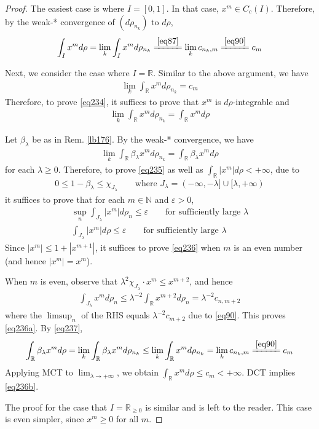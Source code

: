 \documentclass[12pt,b5paper,notitlepage]{article}
\theoremstyle{definition}
\theoremstyle{plain}
\newcommand{\Nbb}{\mathbb N}
\newcommand{\Rbb}{\mathbb R}
\newcommand{\eps}{\varepsilon}
\numberwithin{equation}{section}
\begin{document}
\begin{proof}
The easiest case is where $I=[0,1]$. In that case, $x^m\in C_c(I)$. Therefore, by the weak-* convergence of $(d\rho_{n_k})$ to $d\rho$,
\begin{align*}
\int_I x^md\rho=\lim_k\int_I x^md\rho_{n_k}\xlongequal{\eqref{eq87}}\lim_k c_{n_k,m}\xlongequal{\eqref{eq90}}c_m
\end{align*}

Next, we consider the case where $I=\Rbb$. Similar to the above argument, we have
\begin{align*}
\lim_k\int_\Rbb x^md\rho_{n_k}=c_m
\end{align*}
Therefore, to prove \eqref{eq234}, it suffices to prove that $x^m$ is $d\rho$-integrable and
\begin{align}\label{eq235}
\lim_k\int_\Rbb x^md\rho_{n_k}=\int_\Rbb x^md\rho
\end{align}


Let $\beta_\lambda$ be as in Rem. \ref{lb176}. By the weak-* convergence, we have
\begin{align}\label{eq237}
\lim_k\int_\Rbb\beta_\lambda x^md\rho_{n_k}=\int_\Rbb \beta_\lambda x^md\rho
\end{align}
for each $\lambda\geq0$. Therefore, to prove \eqref{eq235} as well as $\int_\Rbb|x^m|d\rho<+\infty$, due to
\begin{align*}
0\leq 1-\beta_\lambda\leq \chi_{J_\lambda}\qquad\text{where }J_\lambda=(-\infty,-\lambda]\cup[\lambda,+\infty)
\end{align*} 
it suffices to prove that for each $m\in\Nbb$ and $\eps>0$,
\begin{subequations}\label{eq236}
\begin{gather}
\sup_n\int_{J_\lambda}|x^m|d\rho_n\leq\eps\qquad\text{for sufficiently large }\lambda\label{eq236a}\\
\int_{J_\lambda}|x^m|d\rho\leq\eps\qquad\text{for sufficiently large }\lambda\label{eq236b}
\end{gather}
\end{subequations}
Since $|x^m|\leq 1+|x^{m+1}|$, it suffices to prove \eqref{eq236} when $m$ is an even number (and hence $|x^m|=x^m$).


When $m$ is even, observe that $\lambda^2\chi_{J_\lambda}\cdot x^m\leq x^{m+2}$, and hence
\begin{align*}
\int_{J_\lambda} x^md\rho_n\leq\lambda^{-2}\int_\Rbb x^{m+2}d\rho_n=\lambda^{-2}c_{n,m+2}
\end{align*}
where the $\limsup_n$ of the RHS equals $\lambda^{-2}c_{m+2}$ due to \eqref{eq90}. This proves \eqref{eq236a}. By \eqref{eq237}, 
\begin{align*}
\int_\Rbb \beta_\lambda x^md\rho =\lim_k\int_\Rbb\beta_\lambda x^md\rho_{n_k}\leq \lim_k \int_\Rbb x^md\rho_{n_k}=\lim_k c_{n_k,m}\xlongequal{\eqref{eq90}}c_m
\end{align*}
Applying MCT to $\lim_{\lambda\rightarrow+\infty}$, we obtain $\int_\Rbb x^md\rho\leq c_m<+\infty$. DCT implies \eqref{eq236b}.


The proof for the case that $I=\Rbb_{\geq0}$ is similar and is left to the reader. This case is even simpler, since $x^m\geq0$ for all $m$.
\end{proof}
\end{document}
